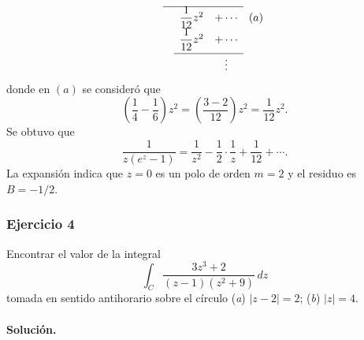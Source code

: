 \documentclass[a4paper]{report}
\begin{document}
\begin{enumerate}
\[\begin{array}[t]{cccccc}
\cline{3-5}
                       &    &                  &  \dfrac{1}{12}z^2 & +\cdots &(a)\\
                       &    &                  &  \dfrac{1}{12}z^2 & +\cdots &\\[\medskipamount]
\cline{4-5}
                       &    &                  &   & \vdots&\\
\end{array}
\]
 donde en \((a)\) se consideró que 
 \[
  \left(\frac{1}{4}-\frac{1}{6}\right)z^2=\left(\frac{3-2}{12}\right)z^2=\frac{1}{12}z^2.
 \]
 Se obtuvo que 
 \[
  \frac{1}{z(e^z-1)}=\frac{1}{z^2}-\frac{1}{2}\cdot\frac{1}{z}+\frac{1}{12}+\cdots.
 \]
 La expansión indica que \(z=0\) es un polo de orden \(m=2\) y el residuo es \(B=-1/2\).
\end{enumerate}

\subsubsection*{Ejercicio 4}

Encontrar el valor de la integral
\[
 \int_C\frac{3z^3+2}{(z-1)(z^2+9)}\,dz
\]
tomada en sentido antihorario sobre el círculo (\textit{a}) \(|z-2|=2\); (\textit{b}) \(|z|=4\).

\paragraph{Solución.}
\end{document}
